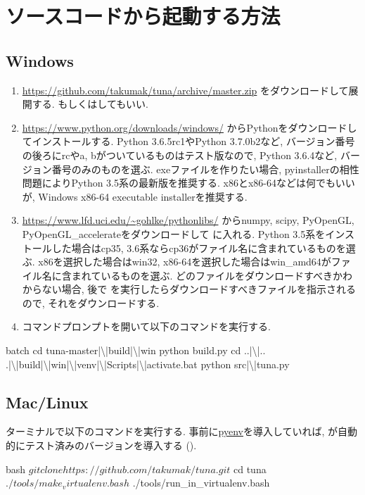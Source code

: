 \clearpage
\section{ソースコードから起動する方法}

\subsection{Windows}

\begin{enumerate}
\item \url{https://github.com/takumak/tuna/archive/master.zip}
  をダウンロードして展開する.
  もしくはしてもいい.
\item \url{https://www.python.org/downloads/windows/}
  からPythonをダウンロードしてインストールする.
  Python 3.6.5rc1やPython 3.7.0b2など, バージョン番号の後ろにrcやa, bがついているものはテスト版なので,
  Python 3.6.4など, バージョン番号のみのものを選ぶ.
  exeファイルを作りたい場合, pyinstallerの相性問題によりPython 3.5系の最新版を推奨する.
  x86とx86-64などは何でもいいが, Windows x86-64 executable installerを推奨する.
\item \url{https://www.lfd.uci.edu/~gohlke/pythonlibs/}
  からnumpy, scipy, PyOpenGL, PyOpenGL\_accelerateをダウンロードして
   に入れる.
  Python 3.5系をインストールした場合はcp35, 3.6系ならcp36がファイル名に含まれているものを選ぶ.
  x86を選択した場合はwin32, x86-64を選択した場合はwin\_amd64がファイル名に含まれているものを選ぶ.
  どのファイルをダウンロードすべきかわからない場合, 後で 
  を実行したらダウンロードすべきファイルを指示されるので, それをダウンロードする.
\item コマンドプロンプトを開いて以下のコマンドを実行する.
\end{enumerate}

\begin{codeb}{batch}
  cd tuna-master|\textbackslash|build|\textbackslash|win
  python build.py
  cd ..|\textbackslash|..
  .|\textbackslash|build|\textbackslash|win|\textbackslash|venv|\textbackslash|Scripts|\textbackslash|activate.bat
  python src|\textbackslash|tuna.py
\end{codeb}

\subsection{Mac/Linux}

ターミナルで以下のコマンドを実行する.
事前に\href{https://github.com/pyenv/pyenv}{pyenv}を導入していれば,
 が自動的にテスト済みのバージョンを導入する%
().

\begin{codeb}{bash}
  $ git clone https://github.com/takumak/tuna.git
  $ cd tuna
  $ ./tools/make_virtualenv.bash
  $ ./tools/run_in_virtualenv.bash
\end{codeb}
